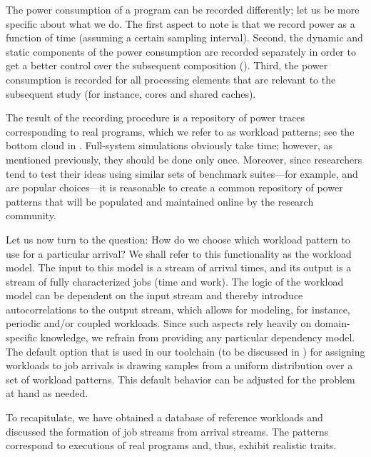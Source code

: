 The power consumption of a program can be recorded differently; let us be more
specific about what we do. The first aspect to note is that we record power as a
function of time (assuming a certain sampling interval). Second, the dynamic and
static components of the power consumption are recorded separately in order to
get a better control over the subsequent composition ().
Third, the power consumption is recorded for all processing elements that are
relevant to the subsequent study (for instance, cores and shared caches).

The result of the recording procedure is a repository of power traces
corresponding to real programs, which we refer to as workload patterns; see the
bottom cloud in . Full-system simulations obviously take time;
however, as mentioned previously, they should be done only once. Moreover, since
researchers tend to test their ideas using similar sets of benchmark
suites---for example,  \cite{bienia2011} and 
\cite{cpu2006} are popular choices---it is reasonable to create a common
repository of power patterns that will be populated and maintained online by the
research community.

Let us now turn to the question: How do we choose which workload pattern to use
for a particular arrival? We shall refer to this functionality as the workload
model. The input to this model is a stream of arrival times, and its output is a
stream of fully characterized jobs (time and work). The logic of the workload
model can be dependent on the input stream and thereby introduce
autocorrelations to the output stream, which allows for modeling, for instance,
periodic and/or coupled workloads. Since such aspects rely heavily on
domain-specific knowledge, we refrain from providing any particular dependency
model. The default option that is used in our toolchain (to be discussed in
) for assigning workloads to job arrivals is drawing samples
from a uniform distribution over a set of workload patterns. This default
behavior can be adjusted for the problem at hand as needed.

To recapitulate, we have obtained a database of reference workloads and
discussed the formation of job streams from arrival streams. The patterns
correspond to executions of real programs and, thus, exhibit realistic traits.
